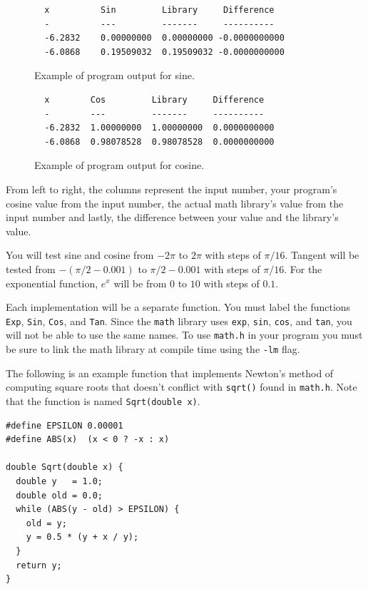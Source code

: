 \documentclass[11pt]{article}
\begin{document}
\begin{figure}[h]
\begin{centering}
  \begin{lstlisting}
  x          Sin         Library     Difference
  -          ---         -------     ----------
  -6.2832	 0.00000000	 0.00000000	-0.0000000000
  -6.0868	 0.19509032	 0.19509032	-0.0000000000\end{lstlisting}
  \caption{Example of program output for sine.}\label{sine}
\end{centering}
\end{figure}

\begin{figure}[h]
\begin{centering}
  \begin{lstlisting}
  x        Cos         Library     Difference
  -        ---         -------     ----------
  -6.2832  1.00000000  1.00000000  0.0000000000
  -6.0868  0.98078528  0.98078528  0.0000000000\end{lstlisting}
  \caption{Example of program output for cosine.}\label{cosine}
\end{centering}
\end{figure}
From left to right, the columns represent the input number, your program's
cosine value from the input number, the actual math library's value from the
input number and lastly, the difference between your value and the library's value.

You will test sine and cosine from $-2\pi$ to $2\pi$ with steps of $\pi/16$.
Tangent will be tested from $-(\pi/2 - 0.001)$ to $\pi/2 - 0.001$ with steps of
$\pi/16$. For the exponential function, $e^x$ will be from $0$ to $10$ with steps of $0.1$.

Each implementation will be a separate function. You must label the functions \texttt{Exp}, \texttt{Sin}, \texttt{Cos}, and \texttt{Tan}. Since the \texttt{math} library uses \texttt{exp}, \texttt{sin}, \texttt{cos}, and \texttt{tan}, you will not be able to use the same names. To use \texttt{math.h} in your program
you must be sure to link the math library at compile time using the
\texttt{-lm} flag.

The following is an example function that implements Newton's method
of computing square roots that doesn't conflict with \texttt{sqrt()}
found in \texttt{math.h}. Note that the function is named
\texttt{Sqrt(double x)}.

\begin{lstlisting}[title=Computing $\sqrt{x}$ using Newton's method.]
#define EPSILON 0.00001
#define ABS(x)  (x < 0 ? -x : x)

double Sqrt(double x) {
  double y   = 1.0;
  double old = 0.0;
  while (ABS(y - old) > EPSILON) {
    old = y;
    y = 0.5 * (y + x / y);
  }
  return y;
}
\end{lstlisting}
\end{document}
